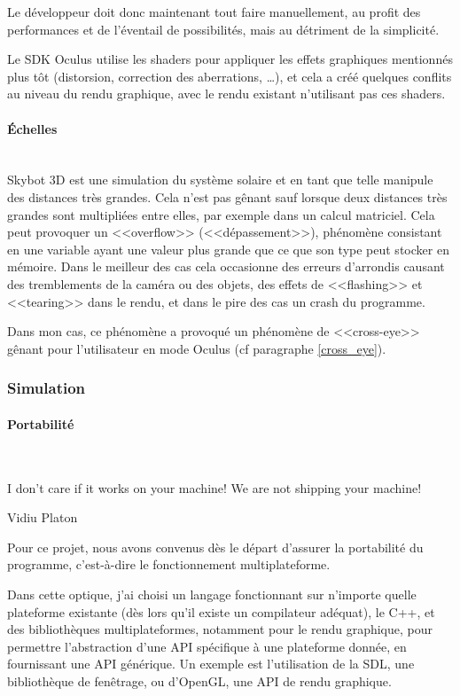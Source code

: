 \documentclass[a4paper,french,12pt]{article}
\begin{document}
		Le développeur doit donc maintenant tout faire manuellement, au profit des performances et de l'éventail
		de possibilités, mais au détriment de la simplicité.

		Le SDK Oculus utilise les shaders pour appliquer les effets graphiques mentionnés plus tôt (distorsion,
		correction des aberrations, \ldots), et cela a créé quelques conflits au niveau du rendu graphique,
		avec le rendu existant n'utilisant pas ces shaders.

	    \paragraph{Échelles} ~\\
	      Skybot 3D est une simulation du système solaire et en tant que telle manipule des distances très grandes.
	      Cela n'est pas gênant sauf lorsque deux distances très grandes sont multipliées entre elles, par exemple
	      dans un calcul matriciel.
	      Cela peut provoquer un <<overflow>> (<<dépassement>>), phénomène consistant en une variable ayant une valeur
	      plus grande que ce que son type peut stocker en mémoire. Dans le meilleur des cas cela occasionne des
	      erreurs d'arrondis causant des tremblements de la caméra ou des objets, des effets de <<flashing>> et
	      <<tearing>> dans le rendu, et dans le pire des cas un crash du programme.

	      Dans mon cas, ce phénomène a provoqué un phénomène de <<cross-eye>> gênant pour l'utilisateur en mode
	      Oculus (cf paragraphe \ref{cross_eye}).

	    \subsubsection{Simulation}
		\paragraph{Portabilité} ~\\
		  \epigraph{I don’t care if it works on your machine!  We are not shipping your machine!}{Vidiu Platon}

		  Pour ce projet, nous avons convenus dès le départ d'assurer la portabilité du programme, c'est-à-dire
		  le fonctionnement multiplateforme.

		  Dans cette optique, j'ai choisi un langage fonctionnant sur n'importe quelle plateforme existante
		  (dès lors qu'il existe un compilateur adéquat), le C++, et
		  des bibliothèques multiplateformes, notamment pour le rendu graphique,
		  pour permettre l'abstraction d'une API spécifique à une plateforme donnée, en fournissant une API générique.
		  Un exemple est l'utilisation de la SDL, une bibliothèque de fenêtrage, ou d'OpenGL, une API de rendu
		  graphique.
\end{document}
